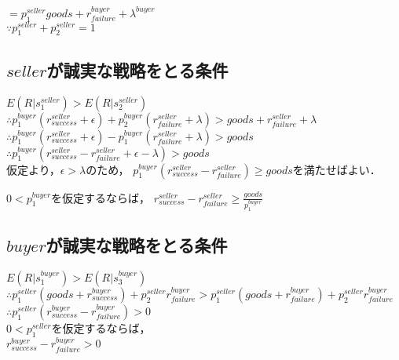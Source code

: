 $ = p^{seller}_1 goods + r^{buyer}_{failure} + \lambda^{buyer} $ \\

$ \because p^{seller}_1 + p^{seller}_2 = 1 $ \\


\subsection{$ seller $が誠実な戦略をとる条件}

$ E(R|s^{seller}_1) > E(R|s^{seller}_2) $ \\

$ \therefore p^{buyer}_1 (r^{seller}_{success} + \epsilon) + p^{buyer}_2 (r^{seller}_{failure} + \lambda) > goods + r^{seller}_{failure} + \lambda $ \\

$ \therefore p^{buyer}_1(r^{seller}_{success} + \epsilon) - p^{buyer}_1(r^{seller}_{failure} + \lambda) > goods $ \\

$ \therefore p^{buyer}_1(r^{seller}_{success} - r^{seller}_{failure} + \epsilon - \lambda) > goods $ \\

仮定より，$ \epsilon > \lambda $のため，
$ p^{buyer}_1 (r^{seller}_{success} - r^{seller}_{failure}) \geq goods $を満たせばよい．

$ 0 < p^{buyer}_1 $を仮定するならば，
$ r^{seller}_{success} - r^{seller}_{failure} \geq \frac{goods}{p^{buyer}_1} $


\subsection{$ buyer $が誠実な戦略をとる条件}

$ E(R|s^{buyer}_1) > E(R|s^{buyer}_3) $ \\

$ \therefore p^{seller}_1 (goods + r^{buyer}_{success}) + p^{seller}_2 r^{buyer}_{failure} > p^{seller}_1(goods+r^{buyer}_{failure}) + p^{seller}_2 r^{buyer}_{failure} $ \\

$ \therefore p^{seller}_1(r^{buyer}_{success} - r^{buyer}_{failure}) > 0 $ \\

$ 0 < p^{seller}_1 $を仮定するならば， \\

$ r^{buyer}_{success} - r^{buyer}_{failure} > 0 $ \\

